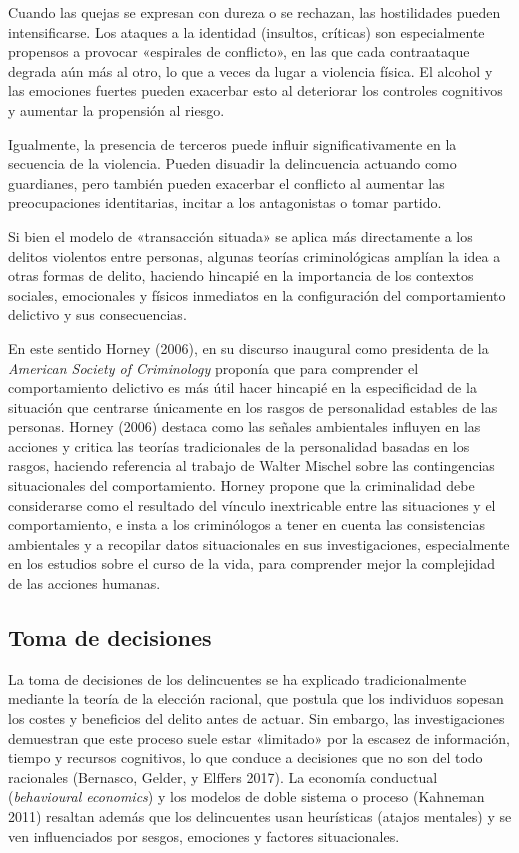 \documentclass[
  spanish,
  letterpaper,
  DIV=11,
  numbers=noendperiod]{scrreprt}
\begin{document}
\begin{tcolorbox}
Cuando las quejas se expresan con dureza o se rechazan, las hostilidades
pueden intensificarse. Los ataques a la identidad (insultos, críticas)
son especialmente propensos a provocar «espirales de conflicto», en las
que cada contraataque degrada aún más al otro, lo que a veces da lugar a
violencia física. El alcohol y las emociones fuertes pueden exacerbar
esto al deteriorar los controles cognitivos y aumentar la propensión al
riesgo.

Igualmente, la presencia de terceros puede influir significativamente en
la secuencia de la violencia. Pueden disuadir la delincuencia actuando
como guardianes, pero también pueden exacerbar el conflicto al aumentar
las preocupaciones identitarias, incitar a los antagonistas o tomar
partido.

\end{tcolorbox}

Si bien el modelo de «transacción situada» se aplica más directamente a
los delitos violentos entre personas, algunas teorías criminológicas
amplían la idea a otras formas de delito, haciendo hincapié en la
importancia de los contextos sociales, emocionales y físicos inmediatos
en la configuración del comportamiento delictivo y sus consecuencias.

En este sentido Horney (2006), en su discurso inaugural como presidenta
de la \emph{American Society of Criminology} proponía que para
comprender el comportamiento delictivo es más útil hacer hincapié en la
especificidad de la situación que centrarse únicamente en los rasgos de
personalidad estables de las personas. Horney (2006) destaca como las
señales ambientales influyen en las acciones y critica las teorías
tradicionales de la personalidad basadas en los rasgos, haciendo
referencia al trabajo de Walter Mischel sobre las contingencias
situacionales del comportamiento. Horney propone que la criminalidad
debe considerarse como el resultado del vínculo inextricable entre las
situaciones y el comportamiento, e insta a los criminólogos a tener en
cuenta las consistencias ambientales y a recopilar datos situacionales
en sus investigaciones, especialmente en los estudios sobre el curso de
la vida, para comprender mejor la complejidad de las acciones humanas.

\subsection{Toma de decisiones}\label{toma-de-decisiones}

La toma de decisiones de los delincuentes se ha explicado
tradicionalmente mediante la teoría de la elección racional, que postula
que los individuos sopesan los costes y beneficios del delito antes de
actuar. Sin embargo, las investigaciones demuestran que este proceso
suele estar «limitado» por la escasez de información, tiempo y recursos
cognitivos, lo que conduce a decisiones que no son del todo racionales
(Bernasco, Gelder, y Elffers 2017). La economía conductual
(\emph{behavioural economics}) y los modelos de doble sistema o proceso
(Kahneman 2011) resaltan además que los delincuentes usan heurísticas
(atajos mentales) y se ven influenciados por sesgos, emociones y
factores situacionales.
\end{document}
